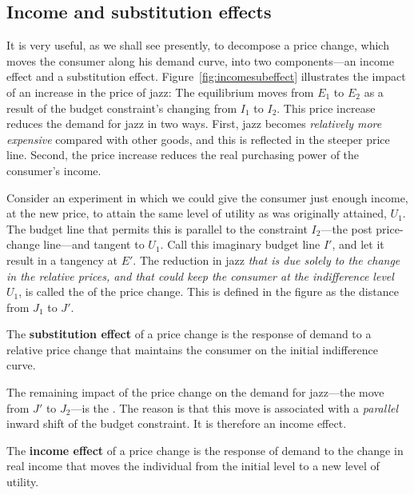 \subsection*{Income and substitution effects}

It is very useful, as we shall see presently, to decompose a price change, which moves the consumer along his demand curve, into two components---an income effect and a substitution effect. Figure~\ref{fig:incomesubeffect} illustrates the impact of an increase in the price of jazz: The equilibrium moves from $E_1$ to $E_2$ as a result of the budget constraint's changing from $I_1$ to $I_2$. This price increase reduces the demand for jazz in two ways. First, jazz becomes \textit{relatively more expensive} compared with other goods, and this is reflected in the steeper price line. Second, the price increase reduces the real purchasing power of the consumer's income.



Consider an experiment in which we could give the consumer just enough income, at the new price, to attain the same level of utility as was originally attained, $U_1$. The budget line that permits this is parallel to the constraint $I_2$---the post price-change line---and tangent to $U_1$. Call this imaginary budget line $I'$, and let it result in a tangency at $E'$. The reduction in jazz \textit{that is due solely to the change in the relative prices, and that could keep the consumer at the indifference level $U_1$}, is called the  of the price change. This is defined in the figure as the distance from $J_1$ to $J'$.

\begin{DefBox}
The \textbf{substitution effect} of a price change is the response of demand to a relative price change that maintains the consumer on the initial indifference curve.
\end{DefBox}

The remaining impact of the price change on the demand for jazz---the move from $J'$ to $J_2$---is the . The reason is that this move is associated with a \textit{parallel} inward shift of the budget constraint. It is therefore an income effect.

\begin{DefBox}
The \textbf{income effect} of a price change is the response of demand to the change in real income that moves the individual from the initial level to a new level of utility.
\end{DefBox}

